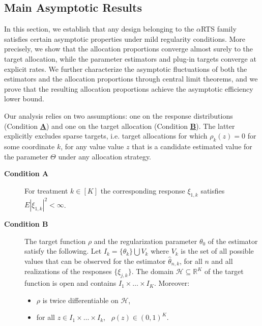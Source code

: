 \subsection{Main Asymptotic Results}

In this section, we establish that any design belonging to the $\alpha$RTS family satisfies certain asymptotic properties under mild regularity conditions. More precisely, we show that the allocation proportions converge almost surely to the target allocation, while the parameter estimators and plug-in targets converge at explicit rates. We further characterize the asymptotic fluctuations of both the estimators and the allocation proportions through central limit theorems, and we prove that the resulting allocation proportions achieve the asymptotic efficiency lower bound.

Our analysis relies on two assumptions: one on the response distributions (Condition \hyperlink{CA}{\textbf{A}}) and one on the target allocation (Condition \hyperlink{CB}{\textbf{B}}). The latter explicitly excludes sparse targets, i.e. target allocations for which $\rho_k(z)=0$ for some coordinate $k$, for any value value $z$ that is a candidate estimated value for the parameter $\Theta$ under any allocation strategy.

\begin{description}
	\item[\hypertarget{CA}{\textbf{Condition A}}] For treatment \(k \in [K]\) the corresponding response \(\xi_{1,k}\) satisfies  $
	E|\xi_{1,k}|^{2} < \infty $. \\
	
	\item[\hypertarget{CB}{\textbf{Condition B}}] The target function $\rho$ and the regularization parameter $\theta_0$ of the estimator satisfy the following. Let $I_k = \{\theta_k\} \bigcup V_k$ where $V_k$ is the set of all possible values that can be observed for the estimator $\hat\theta_{n,k}$, for all $n$ and all realizations of the responses $\{\xi_{j,k}\}$. The domain $\mathcal{H} \subseteq \mathbb{R}^K$ of the target function is open and contains $I_1\times \dots \times I_K$. Moreover:
	\begin{itemize}
		\item \(\rho\) is twice differentiable on $\mathcal{H}$,
		\item for all $z \in I_1\times \dots \times I_k$, \ \(\rho(z) \in (0,1)^K\).
	\end{itemize}
\end{description}

